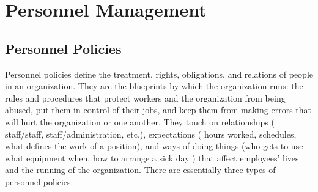 \section{Personnel Management}
\subsection{Personnel Policies}
Personnel policies define the treatment, rights, obligations, and relations of people in an organization. They
are the blueprints by which the organization runs: the rules and procedures that protect workers and the
organization from being abused, put them in control of their jobs, and keep them from making errors that will
hurt the organization or one another. They touch on relationships \big( staff/staff, staff/administration, etc.\big),
expectations \big( hours worked, schedules, what defines the work of a position\big), and ways of doing things \big(who
gets to use what equipment when, how to arrange a sick day \big) that affect employees' lives and the running of
the organization.
There are essentially three types of personnel policies:
